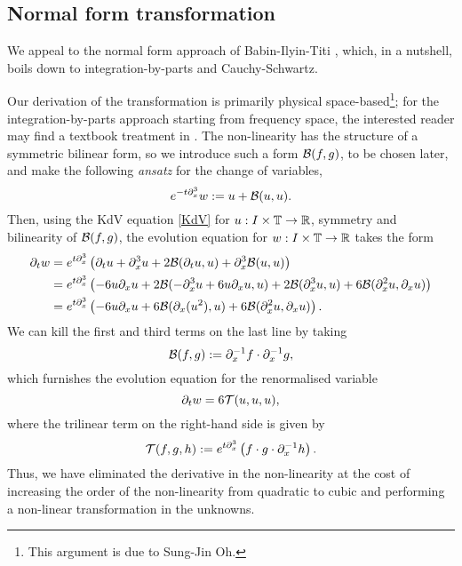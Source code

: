 \subsection{Normal form transformation}


We appeal to the normal form approach of Babin-Ilyin-Titi \cite{BabinEtAl2011}, which, in a nutshell, boils down to integration-by-parts and Cauchy-Schwartz. 

Our derivation of the transformation is primarily physical space-based\footnote{This argument is due to Sung-Jin Oh.}; for the integration-by-parts approach starting from frequency space, the interested reader may find a textbook treatment in \cite[Chapter 3.4, Chapter 4.1.2]{ErdoganTzirakis2016}. The non-linearity has the structure of a symmetric bilinear form, so we introduce such a form $\mathcal B(f, g)$, to be chosen later, and make the following \textit{ansatz} for the change of variables, 
    \begin{equation}\label{eq:normalform}
        e^{-t \partial_x^3} w 
            := u + \mathcal B(u, u).
    \end{equation}
Then, using the KdV equation \eqref{KdV} for $u: I \times \mathbb T \to \mathbb R$, symmetry and bilinearity of $\mathcal B(f, g)$, the evolution equation for $w: I \times \mathbb T \to \mathbb R$ takes the form 
    \begin{align*}
        \partial_t w
            &= e^{t \partial_x^3} \left( \partial_t u + \partial_x^3 u + 2 \mathcal B(\partial_t u, u) + \partial_x^3 \mathcal B(u, u)  \right)\\
            &= e^{t\partial_x^3} \left( - 6 u \partial_x u + 2 \mathcal B(-\partial_x^3 u + 6u \partial_x u, u) + 2 \mathcal B(\partial_x^3 u, u) + 6 \mathcal B(\partial_x^2 u, \partial_x u) \right)\\
            &= e^{t \partial_x^3} \left( -6 u \partial_x u + 6\mathcal B( \partial_x (u^2), u ) + 6 \mathcal B(\partial_x^2 u, \partial_x u) \right). 
    \end{align*}
We can kill the first and third terms on the last line by taking 
    \[
        \mathcal B (f, g) 
            := \partial_x^{-1} f \cdot \partial_x^{-1} g,
    \]
which furnishes the evolution equation for the renormalised variable 
    \begin{equation}\label{eq:renorm}
        \partial_t w 
            = 6\mathcal T(u, u, u),
    \end{equation}
where the trilinear term on the right-hand side is given by 
    \[
        \mathcal T(f, g, h) 
            := e^{t \partial_x^3} \left(f \cdot g \cdot \partial_x^{-1} h\right). 
    \]
Thus, we have eliminated the derivative in the non-linearity at the cost of increasing the order of the non-linearity from quadratic to cubic and performing a non-linear transformation in the unknowns. 

